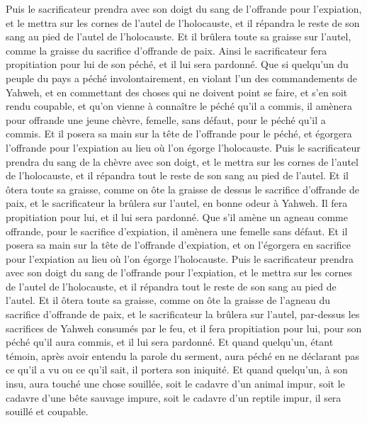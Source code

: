 \begin{multicols}{2}
Puis le sacrificateur prendra avec son doigt du sang de l'offrande pour l'expiation, et le mettra sur les cornes de l'autel de l'holocauste, et il répandra le reste de son sang au pied de l'autel de l'holocauste.
Et il brûlera toute sa graisse sur l'autel, comme la graisse du sacrifice d'offrande de paix. Ainsi le sacrificateur fera propitiation pour lui de son péché, et il lui sera pardonné.
Que si quelqu'un du peuple du pays a péché involontairement, en violant l'un des commandements de Yahweh, et en commettant des choses qui ne doivent point se faire, et s'en soit rendu coupable,
et qu'on vienne à connaître le péché qu'il a commis, il amènera pour offrande une jeune chèvre, femelle, sans défaut, pour le péché qu'il a commis.
Et il posera sa main sur la tête de l'offrande pour le péché, et égorgera l'offrande pour l'expiation au lieu où l'on égorge l'holocauste.
Puis le sacrificateur prendra du sang de la chèvre avec son doigt, et le mettra sur les cornes de l'autel de l'holocauste, et il répandra tout le reste de son sang au pied de l'autel.
Et il ôtera toute sa graisse, comme on ôte la graisse de dessus le sacrifice d'offrande de paix, et le sacrificateur la brûlera sur l'autel, en bonne odeur à Yahweh. Il fera propitiation pour lui, et il lui sera pardonné.
Que s'il amène un agneau comme offrande, pour le sacrifice d'expiation, il amènera une femelle sans défaut.
Et il posera sa main sur la tête de l'offrande d'expiation, et on l'égorgera en sacrifice pour l'expiation au lieu où l'on égorge l'holocauste.
Puis le sacrificateur prendra avec son doigt du sang de l'offrande pour l'expiation, et le mettra sur les cornes de l'autel de l'holocauste, et il répandra tout le reste de son sang au pied de l'autel.
Et il ôtera toute sa graisse, comme on ôte la graisse de l'agneau du sacrifice d'offrande de paix, et le sacrificateur la brûlera sur l'autel, par-dessus les sacrifices de Yahweh consumés par le feu, et il fera propitiation pour lui, pour son péché qu'il aura commis, et il lui sera pardonné.
\VerseOne{}Et quand quelqu'un, étant témoin, après avoir entendu la parole du serment, aura péché en ne déclarant pas ce qu'il a vu ou ce qu'il sait, il portera son iniquité.
Et quand quelqu'un, à son insu, aura touché une chose souillée, soit le cadavre d'un animal impur, soit le cadavre d'une bête sauvage impure, soit le cadavre d'un reptile impur, il sera souillé et coupable.

\end{multicols}
